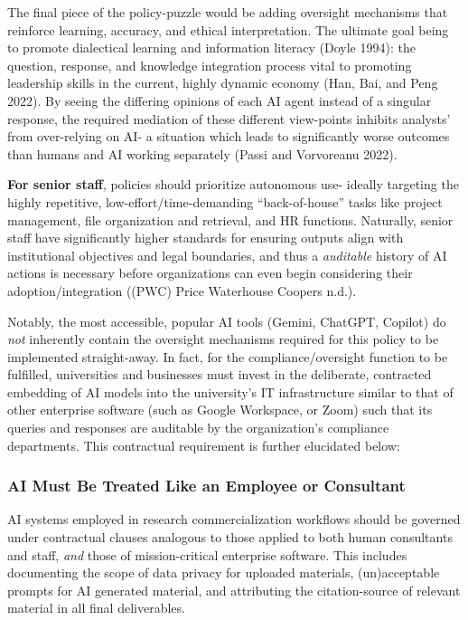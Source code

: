 \documentclass[
]{article}
\begin{document}
The final piece of the policy-puzzle would be adding oversight
mechanisms that reinforce learning, accuracy, and ethical
interpretation. The ultimate goal being to promote dialectical learning
and information literacy (Doyle 1994): the question, response, and
knowledge integration process vital to promoting leadership skills in
the current, highly dynamic economy (Han, Bai, and Peng 2022). By seeing
the differing opinions of each AI agent instead of a singular response,
the required mediation of these different view-points inhibits analysts'
from over-relying on AI- a situation which leads to significantly worse
outcomes than humans and AI working separately (Passi and Vorvoreanu
2022).

\textbf{For senior staff}, policies should prioritize autonomous use-
ideally targeting the highly repetitive, low-effort/time-demanding
``back-of-house'' tasks like project management, file organization and
retrieval, and HR functions. Naturally, senior staff have significantly
higher standards for ensuring outputs align with institutional
objectives and legal boundaries, and thus a \emph{auditable} history of
AI actions is necessary before organizations can even begin considering
their adoption/integration ((PWC) Price Waterhouse Coopers n.d.).

Notably, the most accessible, popular AI tools (Gemini, ChatGPT,
Copilot) do \emph{not} inherently contain the oversight mechanisms
required for this policy to be implemented straight-away. In fact, for
the compliance/oversight function to be fulfilled, universities and
businesses must invest in the deliberate, contracted embedding of AI
models into the university's IT infrastructure similar to that of other
enterprise software (such as Google Workspace, or Zoom) such that its
queries and responses are auditable by the organization's compliance
departments. This contractual requirement is further elucidated below:

\subsubsection{AI Must Be Treated Like an Employee or
Consultant}\label{sec-r-governance}

AI systems employed in research commercialization workflows should be
governed under contractual clauses analogous to those applied to both
human consultants and staff, \emph{and} those of mission-critical
enterprise software. This includes documenting the scope of data privacy
for uploaded materials, (un)acceptable prompts for AI generated
material, and attributing the citation-source of relevant material in
all final deliverables.
\end{document}
